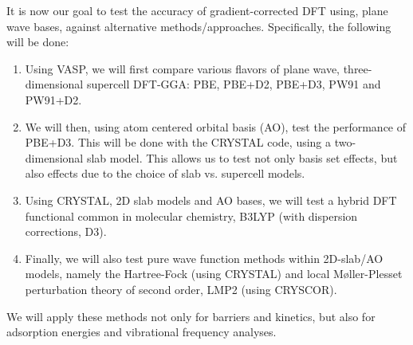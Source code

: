\documentclass[11pt,DIV=13,BCOR=5mm,a4paper,headinclude]{scrbook}
\begin{document}
It is now our goal to test the accuracy of gradient-corrected DFT using, plane wave bases, against alternative methods/approaches.
Specifically, the following will be done:
\begin{enumerate}
\item Using VASP, we will first compare various flavors of plane wave, three-dimensional supercell DFT-GGA: PBE, PBE+D2, PBE+D3, PW91 and PW91+D2.
\item We will then, using atom centered orbital basis (AO), test the performance of PBE+D3.
This will be done with the CRYSTAL code, using a two-dimensional slab model.
This allows us to test not only basis set effects, but also effects due to the choice of slab vs. supercell models.
\item Using CRYSTAL, 2D slab models and AO bases, we will test a hybrid DFT functional common in molecular chemistry, B3LYP (with dispersion corrections, D3).
\item Finally, we will also test pure wave function methods within 2D-slab/AO models, namely the Hartree-Fock (using CRYSTAL) and local M\o{}ller-Plesset perturbation theory of second order, LMP2 (using CRYSCOR).
\end{enumerate}
We will apply these methods not only for barriers and kinetics, but also for adsorption energies and vibrational frequency analyses.

\end{document}
